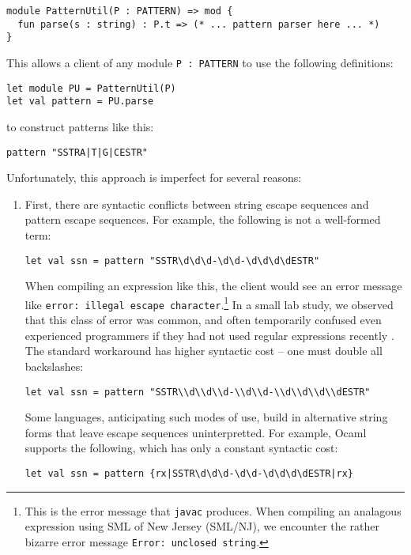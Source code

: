 \begin{lstlisting}[numbers=none]
module PatternUtil(P : PATTERN) => mod {
  fun parse(s : string) : P.t => (* ... pattern parser here ... *)
}
\end{lstlisting}
This allows a client of any module \lstinline{P : PATTERN} to use the following definitions:
\begin{lstlisting}[numbers=none]
let module PU = PatternUtil(P)
let val pattern = PU.parse
\end{lstlisting}
to construct patterns like this:
\begin{lstlisting}[numbers=none]
pattern "SSTRA|T|G|CESTR"
\end{lstlisting}
Unfortunately, this approach is imperfect for several reasons:
\begin{enumerate} 
\item First, there are syntactic conflicts between string escape sequences and pattern escape sequences. For example, the following is not a well-formed term:
\begin{lstlisting}[numbers=none,mathescape=|]
let val ssn = pattern "SSTR\d\d\d-\d\d-\d\d\d\dESTR"
\end{lstlisting}
When compiling an expression like this, the client would see an error message like \verb|error: illegal escape character|.\footnote{This is the error message that \texttt{javac} produces. When compiling an analagous expression using SML of New Jersey (SML/NJ), we encounter the rather bizarre error message \texttt{Error: unclosed string}.} In a small lab study, we observed that this class of error was common, and often temporarily confused even experienced programmers if they had not used regular expressions recently \cite{Omar:2012:ACC:2337223.2337324}. The standard workaround has higher syntactic cost -- one must double all backslashes:
\begin{lstlisting}[numbers=none]
let val ssn = pattern "SSTR\\d\\d\\d-\\d\\d-\\d\\d\\d\\dESTR"
\end{lstlisting}

Some languages, anticipating such modes of use, build in alternative string forms that leave escape sequences uninterpretted. For example, Ocaml supports the following, which has only a constant syntactic cost:
\begin{lstlisting}[numbers=none]
let val ssn = pattern {rx|SSTR\d\d\d-\d\d-\d\d\d\dESTR|rx}
\end{lstlisting}


\end{enumerate}
